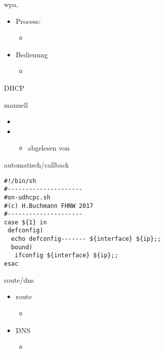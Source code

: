 \begin{frame}[fragile]{wpa}{, }
 \begin{itemize}
  \item Process:
  \begin{itemize}
   \item {}
  \end{itemize}
  \item Bedienung
  \begin{itemize}
   \item {}
  \end{itemize}
 \end{itemize}
\end{frame}

\begin{frame}[fragile]{DHCP}
 \begin{block}{manuell}
  \begin{itemize}
   \item {}
   \item {}
   \begin{itemize}
    \item {} abgelesen von 
   \end{itemize}
  \end{itemize}
 \end{block}
 \begin{block}{automatisch/callback}
\vspace{-3mm}
{\tiny
\begin{verbatim}
#!/bin/sh
#---------------------
#on-udhcpc.sh
#(c) H.Buchmann FHNW 2017
#---------------------
case ${1} in
 defconfig)
  echo defconfig------- ${interface} ${ip};;
  bound)
   ifconfig ${interface} ${ip};;
esac
\end{verbatim}
}
\end{block}
\end{frame}

\begin{frame}{route/dns}
\begin{itemize}
 \item route
 \begin{itemize}
  \item {}
 \end{itemize}
 \item DNS
 \begin{itemize}
   \item {}
 \end{itemize}
\end{itemize}
\end{frame}

